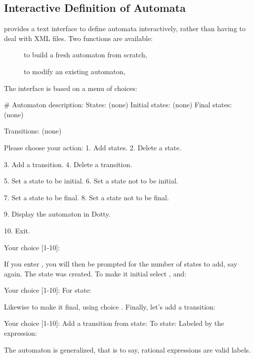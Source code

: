 \subsection{Interactive Definition of Automata}

\tafkit provides a text interface to define automata interactively,
rather than having to deal with XML files.  Two functions are
available:
\begin{description}
\item[] to build a fresh automaton from scratch,
\item[] to modify an existing automaton,
\end{description}

The interface is based on a menu of choices:
\begin{shell}
# 
Automaton description:
  States: (none)
  Initial states: (none)
  Final states: (none)

  Transitions: (none)

Please choose your action:
  1. Add states.
  2. Delete a state.

  3. Add a transition.
  4. Delete a transition.

  5. Set a state to be initial.
  6. Set a state not to be initial.

  7. Set a state to be final.
  8. Set a state not to be final.

  9. Display the automaton in Dotty.

  10. Exit.

Your choice [1-10]:
\end{shell}

\noindent
If you enter , you will then be prompted for the number of
states to add, say  again.  The state  was created.  To
make it initial select , and:

\begin{shell}
Your choice [1-10]: 
  For state: 
\end{shell}

Likewise to make it final, using choice .  Finally, let's add a
transition:

\begin{shell}
Your choice [1-10]: 
  Add a transition from state: 
  To state: 
  Labeled by the expression: 
\end{shell}

\noindent
The automaton is generalized, that is to say, rational expressions are
valid labels.

